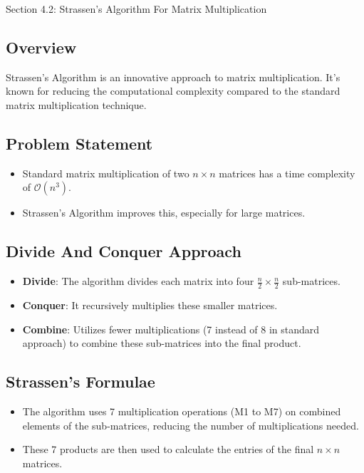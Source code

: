 \begin{notes}{Section 4.2: Strassen's Algorithm For Matrix Multiplication}
    \subsection*{Overview}

    Strassen's Algorithm is an innovative approach to matrix multiplication. It's known for reducing the computational complexity compared to the standard matrix multiplication technique. \vspace*{1em}

    \subsection*{Problem Statement}

    \begin{itemize}
        \item Standard matrix multiplication of two $n \times n$ matrices has a time complexity of $\mathcal{O}(n^{3})$.
        \item Strassen's Algorithm improves this, especially for large matrices.
    \end{itemize}

    \subsection*{Divide And Conquer Approach}

    \begin{itemize}
        \item \textbf{Divide}: The algorithm divides each matrix into four $\frac{n}{2} \times \frac{n}{2}$ sub-matrices.
        \item \textbf{Conquer}: It recursively multiplies these smaller matrices.
        \item \textbf{Combine}: Utilizes fewer multiplications (7 instead of 8 in standard approach) to combine these sub-matrices into the final product.
    \end{itemize}

    \subsection*{Strassen's Formulae}

    \begin{itemize}
        \item The algorithm uses 7 multiplication operations (M1 to M7) on combined elements of the sub-matrices, reducing the number of multiplications needed.
        \item These 7 products are then used to calculate the entries of the final $n \times n$ matrices.
    \end{itemize}


\end{notes}
